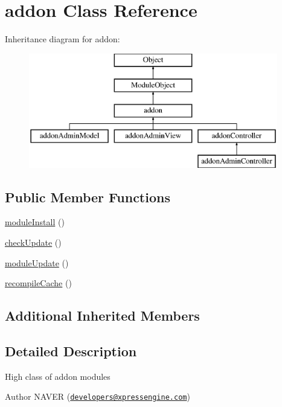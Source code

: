 \hypertarget{classaddon}{}\section{addon Class Reference}
\label{classaddon}
Inheritance diagram for addon\+:\begin{figure}[H]
\begin{center}
\leavevmode
\includegraphics[height=5.000000cm]{classaddon}
\end{center}
\end{figure}
\subsection*{Public Member Functions}
\begin{DoxyCompactItemize}
\item 
\hyperlink{classaddon_a7ac2ab52a9e9cdc5c890b38a958b74ab}{module\+Install} ()
\item 
\hyperlink{classaddon_a88804ecbcb4993b0ad3fe2ac9763f17b}{check\+Update} ()
\item 
\hyperlink{classaddon_af26212943701043993c73a5e81e93ca1}{module\+Update} ()
\item 
\hyperlink{classaddon_ad2d70e001c5ec84c799e31c4fa761d9c}{recompile\+Cache} ()
\end{DoxyCompactItemize}
\subsection*{Additional Inherited Members}


\subsection{Detailed Description}
High class of addon modules \begin{DoxyAuthor}{Author}
N\+A\+V\+ER (\href{mailto:developers@xpressengine.com}{\tt developers@xpressengine.\+com}) 
\end{DoxyAuthor}


